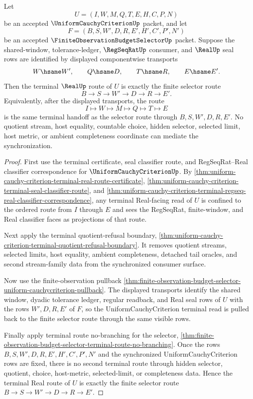 
\begin{theorem}
\label{thm:uniform-cauchy-criterion-finite-observation-terminal-synchronization}
Let
$$
U=(I,W,M,Q,T,E,H,C,P,N)
$$
be an accepted $\UniformCauchyCriterionUp$ packet, and let
$$
F=(B,S,W',D,R,E',H',C',P',N')
$$
be an accepted $\FiniteObservationBudgetSelectorUp$ packet. Suppose the shared-window, tolerance-ledger, $\RegSeqRatUp$ consumer, and $\RealUp$ seal rows are identified by displayed componentwise transports
$$
W \hsame W',\qquad
Q \hsame D,\qquad
T \hsame R,\qquad
E \hsame E'.
$$
Then the terminal $\RealUp$ route of $U$ is exactly the finite selector route
$$
B \to S \to W' \to D \to R \to E'.
$$
Equivalently, after the displayed transports, the route
$$
I \longmapsto W \longmapsto M \longmapsto Q \longmapsto T \longmapsto E
$$
is the same terminal handoff as the selector route through $B,S,W',D,R,E'$. No quotient stream, host equality, countable choice, hidden selector, selected limit, host metric, or ambient completeness coordinate can mediate the synchronization.
\end{theorem}
\begin{proof}
First use the terminal certificate, seal classifier route, and RegSeqRat--Real classifier correspondence for $\UniformCauchyCriterionUp$. By \autoref{thm:uniform-cauchy-criterion-terminal-real-route-certificate}, \autoref{thm:uniform-cauchy-criterion-terminal-seal-classifier-route}, and \autoref{thm:uniform-cauchy-criterion-terminal-regseq-real-classifier-correspondence}, any terminal Real-facing read of $U$ is confined to the ordered route from $I$ through $E$ and sees the RegSeqRat, finite-window, and Real classifier faces as projections of that route.

Next apply the terminal quotient-refusal boundary, \autoref{thm:uniform-cauchy-criterion-terminal-quotient-refusal-boundary}. It removes quotient streams, selected limits, host equality, ambient completeness, detached tail oracles, and second stream-family data from the synchronized consumer surface.

Now use the finite-observation pullback \autoref{thm:finite-observation-budget-selector-uniform-cauchycriterion-pullback}. The displayed transports identify the shared window, dyadic tolerance ledger, regular readback, and Real seal rows of $U$ with the rows $W',D,R,E'$ of $F$, so the UniformCauchyCriterion terminal read is pulled back to the finite selector route through the same visible rows.

Finally apply terminal route no-branching for the selector, \autoref{thm:finite-observation-budget-selector-terminal-route-no-branching}. Once the rows $B,S,W',D,R,E',H',C',P',N'$ and the synchronized UniformCauchyCriterion rows are fixed, there is no second terminal route through hidden selector, quotient, choice, host-metric, selected-limit, or completeness data. Hence the terminal Real route of $U$ is exactly the finite selector route $B \to S \to W' \to D \to R \to E'$.
\end{proof}

